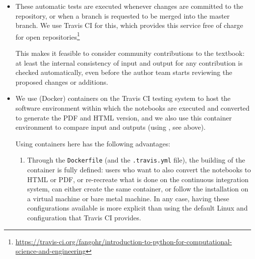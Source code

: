 \documentclass{deliverablereport}
\begin{document}
{{{\begin{itemize}
  In the context of this textbook, there are two common sources for
  deviations reported by \nbval:
  \begin{enumerate}
  \item Changes in the chapter have had (unexpected) side effects
    later in the chapter, combined with a failure to re-execute the
    whole chapter manually to check for such deviations after the
    changes were introduced.
  \item Changes in libraries we depend on: for example, the change to
    Matplotlib version 3 has introduced new behaviour of Matplotlib,
    which resulted in different outputs.
  \end{enumerate}

\item These automatic tests are executed whenever changes are
  committed to the repository, or when a branch is requested to be
  merged into the master branch. We use Travis CI for this, which
  provides this service free of charge for open repositories\footnote{\scriptsize
  \url{https://travis-ci.org/fangohr/introduction-to-python-for-computational-science-and-engineering}}

  This makes it feasible to consider community contributions to the
  textbook: at least the internal consistency of input and output for
  any contribution is checked automatically, even before the author
  team starts reviewing the proposed changes or additions.

\item We use (Docker) containers on the Travis CI testing system to
  host the software environment within which the notebooks are
  executed and converted to generate the PDF and HTML version, and we
  also use this container environment to compare input and outputs
  (using \nbval, see above).

  Using containers here has the following advantages:
  \begin{enumerate}
  \item Through the \texttt{Dockerfile} (and the \texttt{.travis.yml}
    file), the building of the container is fully defined: users who
    want to also convert the notebooks to HTML or PDF, or re-recreate
    what is done on the continuous integration system, can either
    create the same container, or follow the installation on a virtual
    machine or bare metal machine. In any case, having these
    configurations available is more explicit than using the default
    Linux and configuration that Travis CI provides.


\end{enumerate}
\end{itemize}}}}
\end{document}
